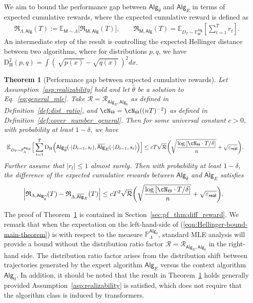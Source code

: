 \documentclass[10pt]{article}
\newtheorem{theorem}{Theorem}
\renewcommand{\epsilon}{\varepsilon}
\newcommand{\<}{\left\langle}
\renewcommand{\>}{\right\rangle}
\newcommand{\paren}[1]{{\left( #1 \right)}}
\newcommand{\brac}[1]{{\left[ #1 \right]}}
\newcommand{\E}{\mathbb{E}}
\renewcommand{\P}{\mathbb{P}}
\newcommand{\inst}{{\mathsf{M}}}
\newcommand{\HelDs}{{\mathrm{D}^2_{\mathrm{H}}}}
\newcommand{\HelD}{{\mathrm{D}_{\mathrm{H}}}}
\newcommand{\state}{{s}}
\newcommand{\reward}{{r}}
\newcommand{\totlen}{{T}}
\newcommand{\sAlg}{{\mathsf{Alg}}}
\newcommand{\osAlg}{\overline{\mathsf{Alg}}}
\newcommand{\dset}{{D}}
\newcommand{\Numobs}{{n}}
\newcommand{\Parspace}{{\Theta}}
\newcommand{\EstPar}{{\widehat{\theta}}}
\newcommand{\prior}{{\Lambda}}
\newcommand{\shortexp}{{E}}
\newcommand{\geneps}{{\epsilon}_{\sf real}}
\newcommand{\totreward}{{\mathfrak{R}}}
\newcommand{\distratio}{{\mathcal{R}}}
\begin{document}
We aim to bound the performance gap between $\sAlg_{\EstPar}$ and $\sAlg_\shortexp$ in terms of expected cumulative rewards, where the expected cumulative reward is defined as
\begin{align*}
\textstyle \totreward_{\prior,\sAlg}(\totlen)
:= \E_{\inst\sim\prior}\big[\totreward_{\inst,\sAlg}(\totlen) \big],~~~~~~~~~ \totreward_{\inst,\sAlg}(\totlen) = \E_{\dset_{\totlen} \sim\P^{\sAlg}_\inst}[\sum_{t=1}^\totlen \reward_t].
\end{align*}
An intermediate step of the result is controlling the expected Hellinger distance between two algorithms, where for distributions $p, q$, we have $\HelDs(p, q) = \int (\,\sqrt{p(x)} - \sqrt{q(x)} \,)^2 d x$.
\begin{theorem}[Performance gap between expected cumulative rewards]\label{thm:diff_reward} Let Assumption~\ref{asp:realizability} hold and let $\EstPar$ be a solution to Eq.~\eqref{eq:general_mle}. Take $\distratio = \distratio_{\osAlg_\shortexp,\sAlg_0}$ as defined in Definition~\ref{def:dist_ratio}, and $\cN_{\Parspace} = \cN_{\Parspace}((\Numobs\totlen)^{-2})$  as defined in Definition~\ref{def:cover_number_general}. Then for some universal constant $c>0$, with probability at least $1-\delta$, we have
\begin{align}\label{eqn:Hellinger-bound-main-theorem}
&~ \E_{\dset_\totlen\sim \P^{\sAlg_\shortexp}_\prior}\Big[ \sum_{t=1}^\totlen \HelD \paren{  \sAlg_{{\EstPar}}(\cdot|\dset_{t-1},\state_t ),\osAlg_{\shortexp}(\cdot|\dset_{t-1},\state_t )} \Big]
\le c {\totlen} \sqrt{\distratio}
\bigg(\sqrt{\frac{\log \brac{ \cN_{\Parspace} \cdot
 \totlen/\delta } }{n}} +  \sqrt{\geneps}\bigg).
\end{align}
Further assume that $|\reward_t| \leq 1$ almost surely. Then with probability at least $1-\delta$, the difference of the expected cumulative rewards between $\sAlg_\EstPar$ and $\osAlg_\shortexp$ satisfies
\begin{align}\label{eqn:reward-bound-main-theorem}
\Big|\totreward_{\prior,\sAlg_\EstPar}(\totlen)-\totreward_{\prior,\osAlg_\shortexp}(\totlen)\Big|
&\leq
c \totlen^2 \sqrt{\distratio} \bigg(\sqrt{\frac{\log \brac{ \cN_{\Parspace} \cdot
 \totlen/\delta } }{n}} +  \sqrt{\geneps}\bigg).
\end{align}
\end{theorem}
The proof of Theorem~\ref{thm:diff_reward} is contained in Section~\ref{sec:pf_thm:diff_reward}.
We remark that when the expectation on the left-hand-side of (\ref{eqn:Hellinger-bound-main-theorem}) is with respect to the measure $\P_\prior^{\sAlg_0}$, standard MLE analysis will provide a bound without the distribution ratio factor $\distratio = \distratio_{\osAlg_\shortexp,\sAlg_0}$ in the right-hand side. The distribution ratio factor arises from the distribution shift between trajectories generated by the expert algorithm $\sAlg_\shortexp$ versus the context algorithm $\sAlg_0$.  In addition, it should be noted that the result in Theorem~\ref{thm:diff_reward} holds generally provided Assumption~\ref{asp:realizability} is satisfied, which does not require that the algorithm class is induced by transformers.
\end{document}
